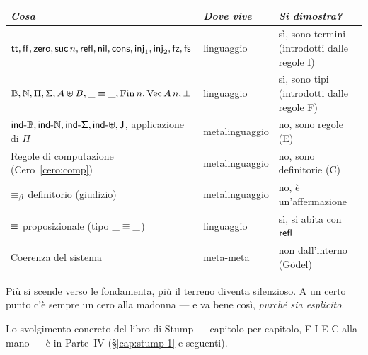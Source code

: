 \begin{center}
\renewcommand{\arraystretch}{1.25}
\begin{tabular}{p{6cm}p{3cm}p{4cm}}
\toprule
\textit{Cosa} & \textit{Dove vive} & \textit{Si dimostra?} \\
\midrule
$\mathsf{tt}, \mathsf{ff}, \mathsf{zero}, \mathsf{suc}\,n, \mathsf{refl}, \mathsf{nil}, \mathsf{cons}, \mathsf{inj}_1, \mathsf{inj}_2, \mathsf{fz}, \mathsf{fs}$ & linguaggio & s\`i, sono termini (introdotti dalle regole I) \\
$\mathbb{B}, \mathbb{N}, \Pi, \Sigma, A \uplus B, \_\equiv\_, \mathrm{Fin}\,n, \mathrm{Vec}\,A\,n, \bot$ & linguaggio & s\`i, sono tipi (introdotti dalle regole F) \\
$\mathsf{ind\text{-}\mathbb{B}}, \mathsf{ind\text{-}\mathbb{N}}, \mathsf{ind\text{-}\Sigma}, \mathsf{ind}\text{-}\uplus, \mathsf{J}$, applicazione di $\Pi$ & metalinguaggio & no, sono regole (E) \\
Regole di computazione (Cero~\ref{cero:comp}) & metalinguaggio & no, sono definitorie (C) \\
$\equiv_{\beta}$ definitorio (giudizio) & metalinguaggio & no, \`e un'affermazione \\
$\equiv$ proposizionale (tipo $\_\equiv\_$) & linguaggio & s\`i, si abita con $\mathsf{refl}$ \\
Coerenza del sistema & meta-meta & non dall'interno (G\"odel) \\
\bottomrule
\end{tabular}
\end{center}

\bigskip

\noindent Pi\`u si scende verso le fondamenta, pi\`u il terreno diventa silenzioso. A un certo punto c'\`e sempre un cero alla madonna --- e va bene cos\`i, \emph{purch\'e sia esplicito}.

\bigskip

\noindent Lo svolgimento concreto del libro di Stump --- capitolo per capitolo, F-I-E-C alla mano --- \`e in Parte~IV (\S\ref{cap:stump-1} e seguenti).
